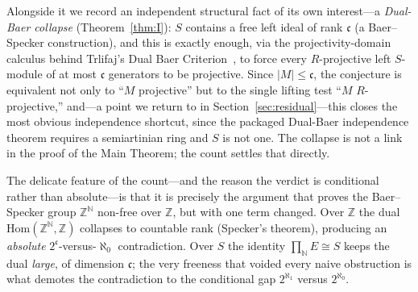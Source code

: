 \documentclass[11pt,reqno]{amsart}
\theoremstyle{plain}
\theoremstyle{definition}
\theoremstyle{remark}
\newcommand{\Hom}{\mathrm{Hom}}
\newcommand{\N}{\mathbb{N}}
\newcommand{\Z}{\mathbb{Z}}
\begin{document}
Alongside it we record an independent structural fact of its own interest---a \emph{Dual-Baer collapse} (Theorem~\ref{thm:I}): $S$ contains a free left ideal of rank $\mathfrak c$ (a Baer--Specker construction), and this is exactly enough, via the projectivity-domain calculus behind Trlifaj's Dual Baer Criterion~\cite{trlifaj-dbc}, to force every $R$-projective left $S$-module of at most $\mathfrak c$ generators to be projective. Since $|M|\le\mathfrak c$, the conjecture is equivalent not only to ``$M$ projective'' but to the single lifting test ``$M$ $R$-projective,'' and---a point we return to in Section~\ref{sec:residual}---this closes the most obvious independence shortcut, since the packaged Dual-Baer independence theorem requires a semiartinian ring and $S$ is not one. The collapse is not a link in the proof of the Main Theorem; the count settles that directly.

The delicate feature of the count---and the reason the verdict is conditional rather than absolute---is that it is precisely the argument that proves the Baer--Specker group $\Z^{\N}$ non-free over $\Z$, but with one term changed. Over $\Z$ the dual $\Hom(\Z^{\N},\Z)$ collapses to countable rank (Specker's theorem), producing an \emph{absolute} $2^{\mathfrak c}$-versus-$\aleph_0$ contradiction. Over $S$ the identity $\prod_{\N}E\cong S$ keeps the dual \emph{large}, of dimension $\mathfrak c$; the very freeness that voided every naive obstruction is what demotes the contradiction to the conditional gap $2^{\aleph_1}$ versus $2^{\aleph_0}$.
\end{document}
